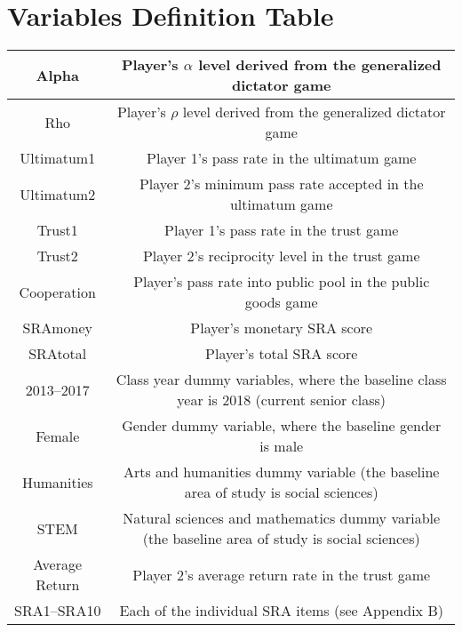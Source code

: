 \section{Variables Definition Table}

\begin{center}
\begin{adjustbox}{width=\textwidth}
\begin{tabular}{ |c|c| } 
 \hline
 Alpha & Player\rq s \(\alpha\) level derived from the generalized dictator game \\ 
 \hline
  Rho & Player\rq s \(\rho\) level derived from the generalized dictator game \\ 
 \hline
 Ultimatum1 & Player 1\rq s pass rate in the ultimatum game \\ 
 \hline
 Ultimatum2 & Player 2\rq s minimum pass rate accepted in the ultimatum game  \\ 
 \hline
 Trust1 & Player 1\rq s pass rate in the trust game \\ 
 \hline
 Trust2 & Player 2\rq s reciprocity level in the trust game \\ 
 \hline
 Cooperation & Player\rq s pass rate into public pool in the public goods game  \\ 
 \hline
 SRAmoney & Player\rq s monetary SRA score \\ 
 \hline
 SRAtotal & Player\rq s total SRA score \\ 
 \hline
 2013--2017 & Class year dummy variables, where the baseline class year is 2018 (current senior class) \\
 \hline
 Female & Gender dummy variable, where the baseline gender is male \\
 \hline
 Humanities & Arts and humanities dummy variable (the baseline area of study is social sciences) \\
 \hline
 STEM & Natural sciences and mathematics dummy variable (the baseline area of study is social sciences) \\
 \hline
 Average Return &  Player 2\rq s average return rate in the trust game \\
 \hline
 SRA1--SRA10 & Each of the individual SRA items (see Appendix B) \\
\hline
\end{tabular}
\end{adjustbox}
\end{center}